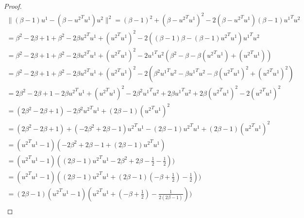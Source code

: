 \begin{proof}
\begin{align*}
\|(\beta - 1)u^1-(\beta - {u^2}^Tu^1)u^2\|^2 = (\beta - 1)^2 + (\beta - {u^2}^Tu^1)^2 - 2(\beta - {u^2}^Tu^1)(\beta - 1){u^1}^Tu^2 \\   
 = \beta^2 - 2\beta + 1 + \beta^2 - 2 \beta {u^2}^Tu^1 +({u^2}^Tu^1)^2 - 2((\beta - 1)\beta - (\beta - 1){u^2}^Tu^1){u^1}^Tu^2 \\   
 = \beta^2 - 2\beta + 1 + \beta^2 - 2 \beta {u^2}^Tu^1 + ({u^2}^Tu^1)^2 - 2{u^1}^Tu^2(\beta^2 - \beta - \beta({u^2}^Tu^1) + ({u^2}^Tu^1)) \\ 
 = \beta^2 - 2\beta + 1 + \beta^2 - 2 \beta {u^2}^Tu^1 + ({u^2}^Tu^1)^2 - 2(\beta^2{u^1}^Tu^2 - \beta{u^1}^Tu^2 - \beta({u^2}^Tu^1)^2 + ({u^2}^Tu^1)^2) \\ 
 = 2\beta^2 - 2\beta + 1 - 2 \beta {u^2}^Tu^1 + ({u^2}^Tu^1)^2 - 2\beta^2{u^1}^Tu^2 +2 \beta{u^1}^Tu^2 +2 \beta({u^2}^Tu^1)^2 -2 ({u^2}^Tu^1)^2 \\   
 = (2\beta^2 - 2\beta + 1)  -2\beta^2{u^2}^Tu^1 + (2 \beta  - 1)({u^2}^Tu^1)^2   \\  
 = (2\beta^2 - 2\beta + 1)  +(-2\beta^2 + 2 \beta  - 1){u^2}^Tu^1 - (2 \beta  - 1){u^2}^Tu^1 + (2 \beta  - 1)({u^2}^Tu^1)^2   \\
 = ({u^2}^Tu^1 - 1)(-2\beta^2 + 2 \beta  - 1 + (2\beta - 1){u^2}^Tu^1) \\
 =  ({u^2}^Tu^1 - 1)((2\beta - 1){u^2}^Tu^1 - 2\beta^2 +  2\beta  - \frac 1 2 - \frac 1 2 ))\\
 =  ({u^2}^Tu^1 - 1)((2\beta - 1){u^2}^Tu^1 +(2\beta - 1)(-\beta + \frac 1 2) - \frac 1 2 ))\\
 =  (2\beta - 1)({u^2}^Tu^1 - 1)({u^2}^Tu^1 +(-\beta + \frac 1 2) - \frac 1 {2(2\beta - 1)} ))\\
\end{align*}




\end{proof}

